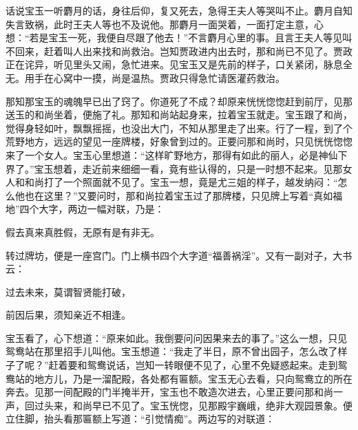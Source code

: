 


\begin{parag}
    话说宝玉一听麝月的话，身往后仰，复又死去，急得王夫人等哭叫不止。麝月自知失言致祸，此时王夫人等也不及说他。那麝月一面哭着，一面打定主意，心想：“若是宝玉一死，我便自尽跟了他去！”不言麝月心里的事。且言王夫人等见叫不回来，赶着叫人出来找和尚救治。岂知贾政进内出去时，那和尚已不见了。贾政正在诧异，听见里头又闹，急忙进来。见宝玉又是先前的样子，口关紧闭，脉息全无。用手在心窝中一摸，尚是温热。贾政只得急忙请医灌药救治。
\end{parag}


\begin{parag}
    那知那宝玉的魂魄早已出了窍了。你道死了不成？却原来恍恍惚惚赶到前厅，见那送玉的和尚坐着，便施了礼。那知和尚站起身来，拉着宝玉就走。宝玉跟了和尚，觉得身轻如叶，飘飘摇摇，也没出大门，不知从那里走了出来。行了一程，到了个荒野地方，远远的望见一座牌楼，好象曾到过的。正要问那和尚时，只见恍恍惚惚来了一个女人。宝玉心里想道：“这样旷野地方，那得有如此的丽人，必是神仙下界了。”宝玉想着，走近前来细细一看，竟有些认得的，只是一时想不起来。见那女人和和尚打了一个照面就不见了。宝玉一想，竟是尤三姐的样子，越发纳闷：“怎么他也在这里？”又要问时，那和尚拉着宝玉过了那牌楼，只见牌上写着“真如福地”四个大字，两边一幅对联，乃是：
\end{parag}


\begin{poem}
    \begin{pl}
        假去真来真胜假，无原有是有非无。
    \end{pl}
\end{poem}


\begin{parag}
    转过牌坊，便是一座宫门。门上横书四个大字道“福善祸淫”。又有一副对子，大书云：
\end{parag}


\begin{poem}
    \begin{pl}
        过去未来，莫谓智贤能打破，
    \end{pl}


    \begin{pl}
        前因后果，须知亲近不相逢。
    \end{pl}

\end{poem}


\begin{parag}
    宝玉看了，心下想道：“原来如此。我倒要问问因果来去的事了。”这么一想，只见鸳鸯站在那里招手儿叫他。宝玉想道：“我走了半日，原不曾出园子，怎么改了样子了呢？”赶着要和鸳鸯说话，岂知一转眼便不见了，心里不免疑惑起来。走到鸳鸯站的地方儿，乃是一溜配殿，各处都有匾额。宝玉无心去看，只向鸳鸯立的所在奔去。见那一间配殿的门半掩半开，宝玉也不敢造次进去，心里正要问那和尚一声，回过头来，和尚早已不见了。宝玉恍惚，见那殿宇巍峨，绝非大观园景象。便立住脚，抬头看那匾额上写道：“引觉情痴”。两边写的对联道：
\end{parag}

